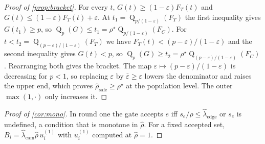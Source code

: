 \begin{proof}[Proof of \cref{prop:bracket}]
For every $t$, $G(t)\ge(1-\varepsilon)F_T(t)$ and $G(t)\le(1-\varepsilon)F_T(t)+\varepsilon$. At $t_1=\operatorname{Q}_{p/(1-\varepsilon)}(F_T)$ the first inequality gives $G(t_1)\ge p$, so $\operatorname{Q}_p(G)\le t_1=\rho^\star\operatorname{Q}_{p/(1-\varepsilon)}(F_C)$. For $t<t_2=\operatorname{Q}_{(p-\varepsilon)/(1-\varepsilon)}(F_T)$ we have $F_T(t)<(p-\varepsilon)/(1-\varepsilon)$ and the second inequality gives $G(t)<p$, so $\operatorname{Q}_p(G)\ge t_2=\rho^\star\operatorname{Q}_{(p-\varepsilon)/(1-\varepsilon)}(F_C)$. Rearranging both gives the bracket. The map $\varepsilon\mapsto(p-\varepsilon)/(1-\varepsilon)$ is decreasing for $p<1$, so replacing $\varepsilon$ by $\bar\varepsilon\ge\varepsilon$ lowers the denominator and raises the upper end, which proves $\hat\rho_{\mathrm{safe}}\ge\rho^\star$ at the population level. The outer $\max(1,\cdot)$ only increases it.
\end{proof}

\begin{proof}[Proof of \cref{cor:mono}]
In round one the gate accepts $e$ iff $s_e/\hat\rho\le\hat\lambda_{\mathrm{edge}}$ or $s_e$ is undefined, a condition that is monotone in $\hat\rho$. For a fixed accepted set, $B_i=\hat\lambda_{\mathrm{cam}}\hat\rho\,u_i^{(1)}$ with $u_i^{(1)}$ computed at $\hat\rho=1$.
\end{proof}
